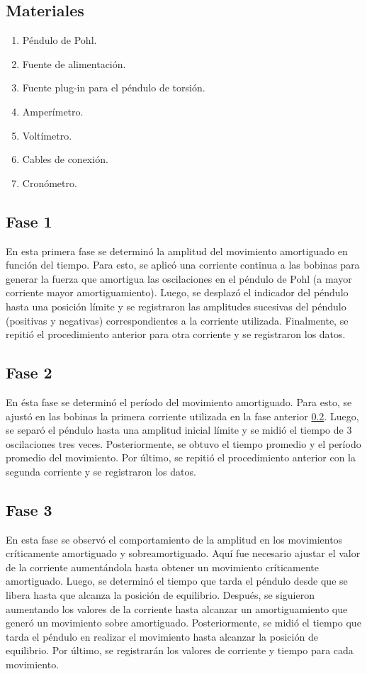 \documentclass[spanish,notitlepage,letterpaper, 12pt]{article}
\begin{document}
\subsection{Materiales}
\begin{enumerate}
    \item Péndulo de Pohl.
    \item Fuente de alimentación.
    \item Fuente plug-in para el péndulo de torsión.
    \item Amperímetro.
    \item Voltímetro.
    \item Cables de conexión.
    \item Cronómetro.
\end{enumerate}
\subsection{Fase 1} \label{M.F1}
En esta primera fase se determinó la amplitud del movimiento amortiguado
en función del tiempo. Para esto, se aplicó una corriente continua a las bobinas para
generar la fuerza que amortigua las oscilaciones en el péndulo de Pohl (a mayor corriente
mayor amortiguamiento). Luego, se desplazó el indicador del péndulo hasta una posición límite y se registraron las
amplitudes sucesivas del péndulo (positivas y negativas) correspondientes a
la corriente utilizada. Finalmente, se repitió el procedimiento anterior para otra corriente
y se registraron los datos.
\subsection{Fase 2} \label{M.F2}
En ésta fase se determinó el período del movimiento amortiguado. Para esto,
se ajustó en las bobinas la primera corriente utilizada en la fase anterior \ref{M.F1}. Luego, se
separó el péndulo hasta una amplitud inicial límite y se midió el tiempo de 3
oscilaciones tres veces. Posteriormente, se obtuvo el tiempo promedio y el período promedio
del movimiento. Por último, se repitió el procedimiento anterior con la segunda
corriente y se registraron los datos.
\subsection{Fase 3} \label{M.F3}
En esta fase se observó el comportamiento de la amplitud en los
movimientos críticamente amortiguado y sobreamortiguado. Aquí fue necesario ajustar el
valor de la corriente aumentándola hasta obtener un movimiento críticamente amortiguado. Luego, se determinó el tiempo que tarda el péndulo desde que se libera hasta que alcanza la posición de
equilibrio. Después, se siguieron aumentando los valores
de la corriente hasta alcanzar un amortiguamiento que generó un movimiento sobre
amortiguado. Posteriormente, se midió el tiempo que tarda el péndulo en realizar el movimiento
hasta alcanzar la posición de equilibrio. Por último, se registrarán los valores de corriente
y tiempo para cada movimiento.
\end{document}
